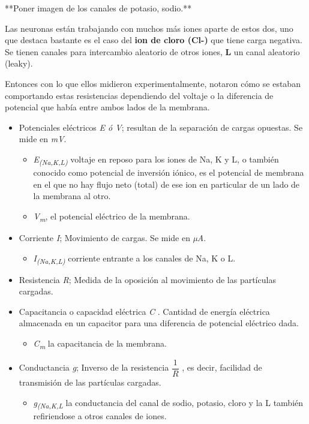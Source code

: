  **Poner imagen de los canales de potasio, sodio.**
 
 
 Las neuronas están trabajando con muchos más iones aparte de estos dos, uno que destaca bastante es el caso del \textbf{ion de cloro (Cl-)} que tiene carga negativa. Se tienen canales para intercambio aleatorio de otros iones, \textbf{L} un canal aleatorio (leaky).

Entonces con lo que ellos midieron experimentalmente, notaron cómo se estaban comportando estas resistencias dependiendo del voltaje o la diferencia de potencial que había entre ambos lados de la membrana. 

\begin{itemize}
\item Potenciales eléctricos \emph{E ó  V}; resultan de la separación de cargas opuestas. Se mide en \emph{mV}.
    \begin{itemize}
     \item \emph{E\textsubscript{(Na,K,L)}} voltaje en reposo para los iones de Na, K y L, o también conocido como  potencial de inversión iónico, es el potencial de membrana en el que no hay flujo neto (total) de ese ion en particular de un lado de la membrana al otro. 
     \item \emph{V\textsubscript{m}}, el potencial eléctrico de la membrana. 
     \end{itemize}

\item Corriente \emph{I}; Movimiento de cargas. Se mide en \emph{µA}.
    \begin{itemize}
     \item \emph{I\textsubscript{(Na,K,L)}} corriente entrante a los canales de Na, K o L.
     \end{itemize}

\item Resistencia \emph{R}; Medida de la oposición al movimiento de las partículas cargadas.
\item Capacitancia o capacidad eléctrica \emph{C} . Cantidad de energía eléctrica almacenada en un capacitor para una diferencia de potencial eléctrico dada.
    \begin{itemize}
     \item \emph{C\textsubscript{m}} la capacitancia de la membrana. 
     \end{itemize}

\item Conductancia \emph{g}; Inverso de la resistencia \( \dfrac{1}{R} \) , es decir, facilidad de transmisión de las partículas cargadas.
    \begin{itemize}
     \item \emph{g\textsubscript{(Na,K,L}}  la conductancia del canal de sodio, potasio, cloro y la L también refiriendose a otros canales de iones. 
     \end{itemize}

\end{itemize}

